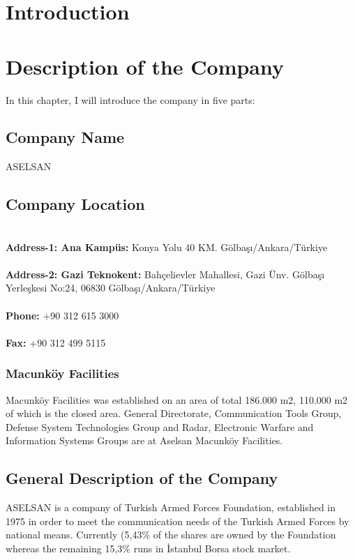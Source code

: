 \tableofcontents
\newpage



\section{Introduction}
\-
\indent 


\section{Description of the Company}
\- \indent
In this chapter, I will introduce the company in five parts:



\subsection{Company Name}
\-
\indent ASELSAN


\subsection{Company Location}
\-
\\
\textbf{ Address-1: Ana Kampüs:} Konya Yolu 40 KM. Gölbaşı/Ankara/Türkiye 
\\
\\
\textbf{ Address-2: Gazi Teknokent:} Bahçelievler Mahallesi, Gazi Ünv. Gölbaşı Yerleşkesi No:24, 06830 Gölbaşı/Ankara/Türkiye 
\\
\\
\textbf{ Phone:} +90 312 615 3000
\\
\\
\textbf{ Fax:} +90 312 499 5115


\subsubsection{Macunköy Facilities}
\- \indent

	Macunköy Facilities was established on an area of total 186.000 m2, 110.000 m2 of which is the closed area. General Directorate, Communication Tools Group, Defense System Technologies Group and Radar, Electronic Warfare and Information Systems Groups are at Aselsan Macunköy Facilities.​ 

\subsection{General Description of the Company}
\-
\indent ASELSAN is a company of Turkish Armed Forces Foundation, established in 1975 in order to meet the communication needs of the Turkish Armed Forces by national means. Currently (5,43\% of the shares are owned by the Foundation whereas the remaining 15,3\% runs in İstanbul Borsa stock market.

